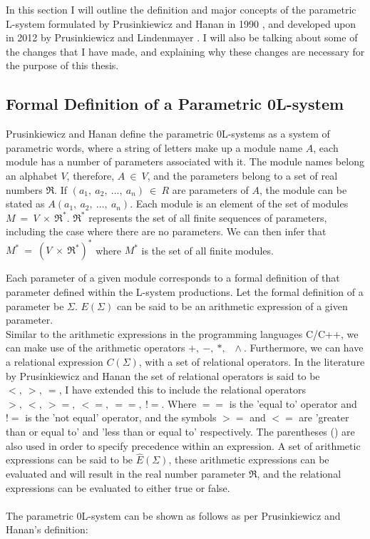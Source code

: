 In this section I will outline the definition and major concepts of the parametric L-system formulated by Prusinkiewicz and Hanan in 1990 \cite{prusinkiewicz1990visualization}, and developed upon in 2012 by Prusinkiewicz and Lindenmayer \cite{prusinkiewicz2012algorithmic}. I will also be talking about some of the changes that I have made, and explaining why these changes are necessary for the purpose of this thesis.


\subsection{Formal Definition of a Parametric 0L-system} \label{definition of a parametric 0L-system section}

Prusinkiewicz and Hanan define the parametric 0L-systems as a system of parametric words, where a string of letters make up a module name $A$, each module has a number of parameters associated with it. The module names belong an alphabet $V$, therefore, $A~ \in~ V$, and the parameters belong to a set of real numbers $\Re$. If $(a_1,~ a_2,~ ...,~ a_n)~ \in~ R$ are parameters of $A$, the module can be stated as $A(a_1,~ a_2,~ ...,~ a_n)$. Each module is an element of the set of modules $M~ =~ V~ \times~ \Re^*$. $\Re^*$ represents the set of all finite sequences of parameters, including the case where there are no parameters. We can then infer that $M^*~ =~ (V~ \times~ \Re^*)^*$ where $M^*$ is the set of all finite modules. 

Each parameter of a given module corresponds to a formal definition of that parameter defined within the L-system productions. Let the formal definition of a parameter be $\Sigma$. $ E(\Sigma) $ can be said to be an arithmetic expression of a given parameter.\\ Similar to the arithmetic expressions in the programming languages C/C++, we can make use of the arithmetic operators $ +,~ -,~ *,~ \,~ \wedge{}$. Furthermore, we can have a relational expression $C(\Sigma)$, with a set of relational operators. In the literature by Prusinkiewicz and Hanan the set of relational operators is said to be $<,~ >,~ =$, I have extended this to include the relational operators $>,~ <,~ >=,~ <=,~ ==,~ !=$. Where $==$ is the 'equal to' operator and $!=$ is the 'not equal' operator, and the symbols $>=$ and $<=$ are 'greater than or equal to' and 'less than or equal to' respectively. The parentheses () are also used in order to specify precedence within an expression. A set of arithmetic expressions can be said to be $\hat{E} (\Sigma)$,  these arithmetic expressions can be evaluated and will result in the real number parameter $\Re $, and the relational expressions can be evaluated to either true or false. \\
\\
The parametric 0L-system can be shown as follows as per Prusinkiewicz and Hanan's definition:

